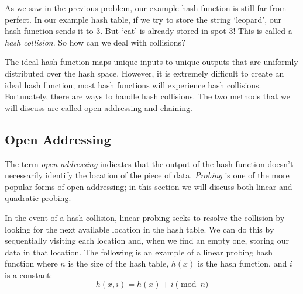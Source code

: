 As we saw in the previous problem, our example hash function is still far from perfect.
In our example hash table, if we try to store the string `leopard', our hash function sends it to 3.
But `cat' is already stored in spot 3!
This is called a \emph{hash collision}.
So how can we deal with collisions?
\begin{center}
\end{center}

The ideal hash function maps unique inputs to unique outputs that are uniformly distributed over the hash space.
However, it is extremely difficult to create an ideal hash function; most hash functions will experience hash collisions.
Fortunately, there are ways to handle hash collisions.
The two methods that we will discuss are called open addressing and chaining.

\subsection*{Open Addressing}
The term \emph{open addressing} indicates that the output of the hash function doesn't necessarily identify the location of the piece of data.
\emph{Probing} is one of the more popular forms of open addressing; in this section we will discuss both linear and quadratic probing.

In the event of a hash collision, linear probing seeks to resolve the collision by looking for the next available location in the hash table.
We can do this by sequentially visiting each location and, when we find an empty one, storing our data in that location.
The following is an example of a linear probing hash function where $n$ is the size of the hash table, $h(x)$ is the hash function, and $i$ is a constant:
\begin{equation*}
h(x, i) = h(x) + i \pmod{n}
\end{equation*}

